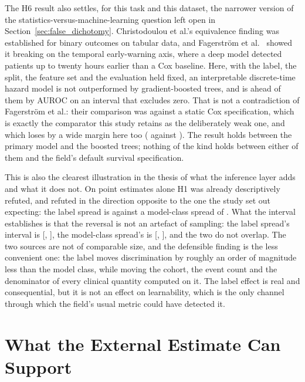 The H6 result also settles, for this task and this dataset, the narrower
version of the statistics-versus-machine-learning question left open in
Section~\ref{sec:false_dichotomy}. Christodoulou et al.'s
\cite{christodoulou2019cox} equivalence finding was established for binary
outcomes on tabular data, and Fagerstr{\"o}m et al.\ \cite{fagerstrom2019lisep}
showed it breaking on the temporal early-warning axis, where a deep model
detected patients up to twenty hours earlier than a Cox baseline. Here, with
the label, the split, the feature set and the evaluation held fixed, an
interpretable discrete-time hazard model is not outperformed by
gradient-boosted trees, and is ahead of them by \pcHSixAbsEst{} AUROC on an
interval that excludes zero. That is not
a contradiction of Fagerstr{\"o}m et al.: their comparison was against a static
Cox specification, which is exactly the comparator this study retains as the
deliberately weak one, and which loses by a wide margin here too
(\pcAurocCoxB{} against \pcAurocPrimaryB). The result holds between the primary
model and the boosted trees; nothing of the kind holds between either of them
and the field's default survival specification.

This is also the clearest illustration in the thesis of what the inference
layer adds and what it does not. On point estimates alone H1 was already
descriptively refuted, and refuted in the direction opposite to the one the
study set out expecting: the label spread is \pcSpreadLabel{} against a
model-class spread of \pcSpreadModelClass. What the interval establishes is
that the reversal is not an artefact of sampling: the label spread's interval
is [\pcSpreadLabelCiLo, \pcSpreadLabelCiHi], the model-class spread's is
[\pcSpreadModelClassCiLo, \pcSpreadModelClassCiHi], and the two do not
overlap. The two sources are not of comparable size, and the defensible
finding is the less convenient one: the label moves discrimination by roughly
an order of magnitude less than the model class, while moving the cohort, the
event count and the denominator of every clinical quantity computed on it. The
label effect is real and consequential, but it is not an effect on
learnability, which is the only channel through which the field's usual metric
could have detected it.


\section{What the External Estimate Can Support}
\label{sec:external_interpretability}

